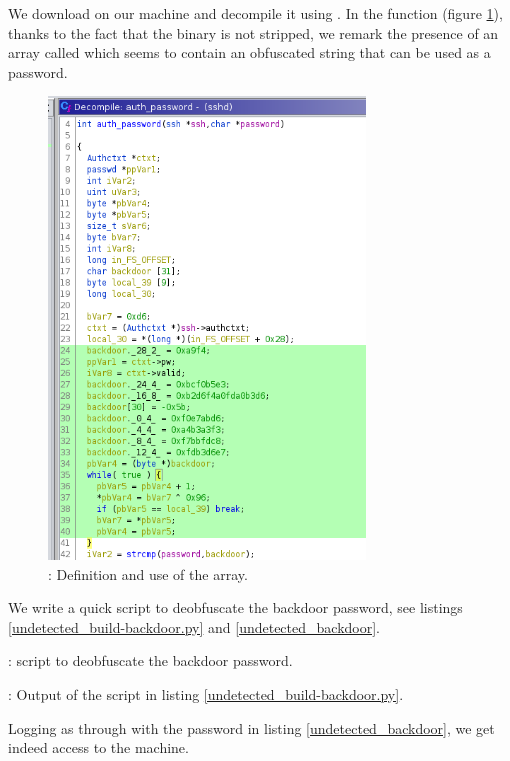 \par We download  on our machine and decompile it using . In the  function (figure \ref{undetected_sshd.png}), thanks to the fact that the binary is not stripped, we remark the presence of an array called  which seems to contain an obfuscated string that can be used as a password.
\begin{figure}
        \includegraphics[width=0.75\textwidth]{sshd.png}
        \centering
        \caption{: Definition and use of the  array.}
        \label{undetected_sshd.png}
\end{figure}
\par We write a quick  script to deobfuscate the backdoor password, see listings \ref{undetected_build-backdoor.py} and \ref{undetected_backdoor}.
\begin{listing}
  \caption{:  script to deobfuscate the backdoor password.}
  \label{undetected_build-backdoor.py}
\end{listing}
\begin{listing}
  
  \caption{: Output of the script in listing \ref{undetected_build-backdoor.py}.}
  \label{undetected_backdoor}
\end{listing}
\par Logging as  through  with the password in listing \ref{undetected_backdoor}, we get indeed  access to the machine.
